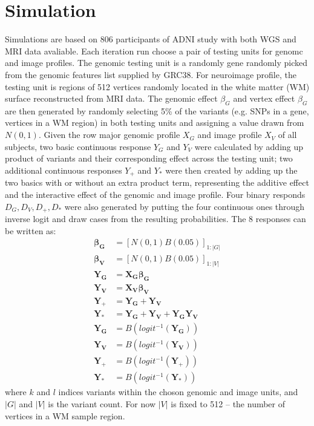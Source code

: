 \documentclass[twocolumn]{article}
\author{Xiaoran Tong}
\begin{document}
\section{Simulation}
Simulations are based on 806 participants of ADNI study with both WGS and MRI data avaliable. Each iteration run choose a pair of testing units for genomc and image profiles. The genomic testing unit is a randomly gene randomly picked from the genomic features list supplied by GRC38. For neuroimage profile, the testing unit is regions of 512 vertices randomly located in the white matter (WM) surface reconstructed from MRI data. The genomic effect $\beta_G$ and vertex effect $\beta_G$ are then generated by randomly selecting 5\% of the variants (e.g. SNPs in a gene, vertices in a WM region) in both testing units and assigning a value drawn from $N(0,1)$. Given the row major genomic profile $X_G$ and image profile $X_V$ of all subjects, two basic continuous response $Y_G$ and $Y_V$ were calculated by adding up product of variants and their corresponding effect across the testing unit; two additional continuous responses $Y_+$ and $Y_*$ were then created by adding up the two basics with or without an extra product term, representing the additive effect and the interactive effect of the genomic and image profile. Four binary responds $D_G, D_V, D_+, D_*$ were also generated by putting the four continuous ones through inverse logit and draw cases from the resulting probabilities. The 8 responses can be written as:
\begin{equation*} \label{eq:SIM}
\begin{split}
  \boldsymbol{\beta_G} &= [N(0,1) B(0.05)]_{1:|G|} \\
  \boldsymbol{\beta_V} &= [N(0,1) B(0.05)]_{1:|V|} \\
  \boldsymbol{Y_G}     &= \boldsymbol{X_G \beta_G} \\
  \boldsymbol{Y_V}     &= \boldsymbol{X_V \beta_V} \\
  \boldsymbol{Y_+}     &= \boldsymbol{Y_G} + \boldsymbol{Y_V} \\
  \boldsymbol{Y_*}     &= \boldsymbol{Y_G} + \boldsymbol{Y_V} + \boldsymbol{Y_G Y_V} \\
  \boldsymbol{Y_G}     &= B(logit^{-1}(\boldsymbol{Y_G})) \\
  \boldsymbol{Y_V}     &= B(logit^{-1}(\boldsymbol{Y_V})) \\
  \boldsymbol{Y_+}     &= B(logit^{-1}(\boldsymbol{Y_+})) \\
  \boldsymbol{Y_*}     &= B(logit^{-1}(\boldsymbol{Y_*}))
\end{split}
\end{equation*}
where $k$ and $l$ indices variants within the choson genomic and image units, and $|G|$ and $|V|$ is the variant count. For now $|V|$ is fixed to 512 -- the number of vertices in a WM sample region.
\end{document}
